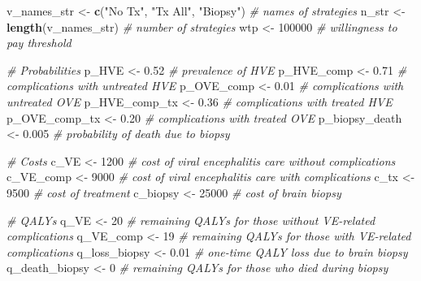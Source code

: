 \documentclass[
]{article}
\newenvironment{Shaded}{\begin{snugshade}}{\end{snugshade}}
\newcommand{\CommentTok}[1]{\textcolor[rgb]{0.56,0.35,0.01}{\textit{#1}}}
\newcommand{\DecValTok}[1]{\textcolor[rgb]{0.00,0.00,0.81}{#1}}
\newcommand{\FloatTok}[1]{\textcolor[rgb]{0.00,0.00,0.81}{#1}}
\newcommand{\KeywordTok}[1]{\textcolor[rgb]{0.13,0.29,0.53}{\textbf{#1}}}
\newcommand{\NormalTok}[1]{#1}
\newcommand{\StringTok}[1]{\textcolor[rgb]{0.31,0.60,0.02}{#1}}
\begin{document}
\begin{Shaded}
\begin{Highlighting}[]
\NormalTok{v_names_str    <-}\StringTok{ }\KeywordTok{c}\NormalTok{(}\StringTok{"No Tx"}\NormalTok{, }\StringTok{"Tx All"}\NormalTok{, }\StringTok{"Biopsy"}\NormalTok{)    }\CommentTok{# names of strategies}
\NormalTok{n_str          <-}\StringTok{ }\KeywordTok{length}\NormalTok{(v_names_str)               }\CommentTok{# number of strategies}
\NormalTok{wtp            <-}\StringTok{ }\DecValTok{100000}                            \CommentTok{# willingness to pay threshold}

\CommentTok{# Probabilities}
\NormalTok{p_HVE          <-}\StringTok{ }\FloatTok{0.52}   \CommentTok{# prevalence of HVE}
\NormalTok{p_HVE_comp     <-}\StringTok{ }\FloatTok{0.71}   \CommentTok{# complications with untreated HVE}
\NormalTok{p_OVE_comp     <-}\StringTok{ }\FloatTok{0.01}   \CommentTok{# complications with untreated OVE}
\NormalTok{p_HVE_comp_tx  <-}\StringTok{ }\FloatTok{0.36}   \CommentTok{# complications with treated HVE}
\NormalTok{p_OVE_comp_tx  <-}\StringTok{ }\FloatTok{0.20}   \CommentTok{# complications with treated OVE}
\NormalTok{p_biopsy_death <-}\StringTok{ }\FloatTok{0.005}  \CommentTok{# probability of death due to biopsy}

\CommentTok{# Costs}
\NormalTok{c_VE           <-}\StringTok{ }\DecValTok{1200}   \CommentTok{# cost of viral encephalitis care without complications}
\NormalTok{c_VE_comp      <-}\StringTok{ }\DecValTok{9000}   \CommentTok{# cost of viral encephalitis care with complications}
\NormalTok{c_tx           <-}\StringTok{ }\DecValTok{9500}   \CommentTok{# cost of treatment}
\NormalTok{c_biopsy       <-}\StringTok{ }\DecValTok{25000}  \CommentTok{# cost of brain biopsy}

\CommentTok{# QALYs}
\NormalTok{q_VE           <-}\StringTok{ }\DecValTok{20}     \CommentTok{# remaining QALYs for those without VE-related complications}
\NormalTok{q_VE_comp      <-}\StringTok{ }\DecValTok{19}     \CommentTok{# remaining QALYs for those with VE-related complications}
\NormalTok{q_loss_biopsy  <-}\StringTok{ }\FloatTok{0.01}   \CommentTok{# one-time  QALY loss due to brain biopsy}
\NormalTok{q_death_biopsy <-}\StringTok{ }\DecValTok{0}      \CommentTok{# remaining QALYs for those who died during biopsy}


\end{Highlighting}
\end{Shaded}
\end{document}
